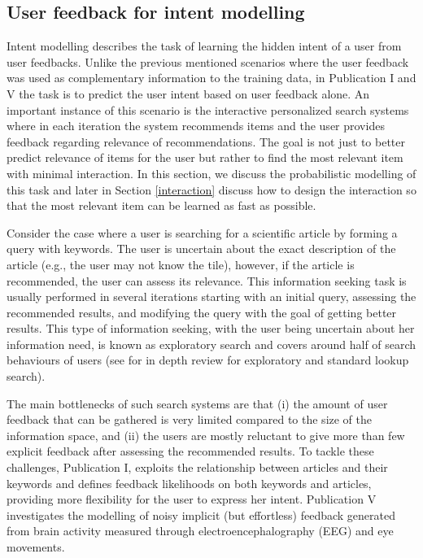 \documentclass[dissertation,math,vertlayout,pdfa,colorlinks]{aaltoseries}
\begin{document}
\subsection{User feedback for intent modelling}\label{feedback_intent_modelling}

Intent modelling describes the task of learning the hidden intent of a user from user feedbacks. Unlike the previous mentioned scenarios where the user feedback was used as complementary information to the training data, in Publication I and V the task is to predict the user intent based on user feedback alone. An important instance of this scenario is the interactive personalized search systems where in each iteration the system recommends items and the user provides feedback regarding relevance of recommendations. The goal is not just to better predict relevance of items for the user but rather to find the most relevant item with minimal interaction. In this section, we discuss the probabilistic modelling of this task and later in Section \ref{interaction} discuss how to design the interaction so that the most relevant item can be learned as fast as possible. 

Consider the case where a user is searching for a scientific article by forming a query with keywords. The user is uncertain about the exact description of the article (e.g., the user may not know the tile), however, if the article is recommended, the user can assess its relevance. This information seeking task is usually performed in several iterations starting with an initial query, assessing the recommended results, and modifying the query with the goal of getting better results. This type of information seeking, with the user being uncertain about her information need, is known as exploratory search \cite{Marchionini2006,white2009exploratory} and covers around half of search behaviours of users \cite{Teevan_2004} (see \cite{paba_exploratory_vs_lookup} for in depth review for exploratory and standard lookup search). 

The main bottlenecks of such search systems are that (i) the amount of user feedback that can be gathered is very limited compared to the size of the information space, and (ii) the users are mostly reluctant to give more than few explicit feedback after assessing the recommended results. To tackle these challenges, Publication I, exploits the relationship between articles and their keywords and defines feedback likelihoods on both keywords and articles, providing more flexibility for the user to express her intent. Publication V investigates the modelling of noisy implicit (but effortless) feedback generated from brain activity measured through electroencephalography (EEG) and eye movements.  
\end{document}
